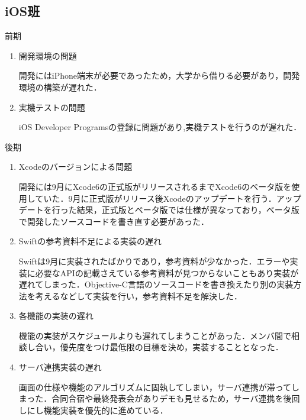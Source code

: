 \subsection{iOS班}
前期
\begin{enumerate}
\item 開発環境の問題
\par 開発にはiPhone端末が必要であったため，大学から借りる必要があり，開発環境の構築が遅れた．
\item 実機テストの問題
\par iOS Developer Programsの登録に問題があり,実機テストを行うのが遅れた．
\end{enumerate}

後期
\begin{enumerate}
\item Xcodeのバージョンによる問題
\par 開発には9月にXcode6の正式版がリリースされるまでXcode6のベータ版を使用していた．9月に正式版がリリース後Xcodeのアップデートを行う．アップデートを行った結果，正式版とベータ版では仕様が異なっており，ベータ版で開発したソースコードを書き直す必要があった．
\item Swiftの参考資料不足による実装の遅れ
\par Swiftは9月に実装されたばかりであり，参考資料が少なかった．エラーや実装に必要なAPIの記載さえている参考資料が見つからないこともあり実装が遅れてしまった．Objective-C言語のソースコードを書き換えたり別の実装方法を考えるなどして実装を行い，参考資料不足を解決した．
\item 各機能の実装の遅れ
\par 機能の実装がスケジュールよりも遅れてしまうことがあった．メンバ間で相談し合い，優先度をつけ最低限の目標を決め，実装することとなった．
\item サーバ連携実装の遅れ
\par
画面の仕様や機能のアルゴリズムに固執してしまい，サーバ連携が滞ってしまった．合同合宿や最終発表会がありデモも見せるため，サーバ連携を後回しにし機能実装を優先的に進めている．
\end{enumerate}


